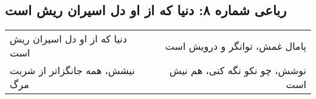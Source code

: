 \begin{center}
\section*{رباعی شماره ۸: دنیا که از او دل اسیران ریش است}
\label{sec:008}
\begin{longtable}{l p{0.5cm} r}
دنیا که از او دل اسیران ریش است
&&
پامال غمش، توانگر و درویش است
\\
نیشش، همه جانگزاتر از شربت مرگ
&&
نوشش، چو نکو نگه کنی، هم نیش است
\\
\end{longtable}
\end{center}
